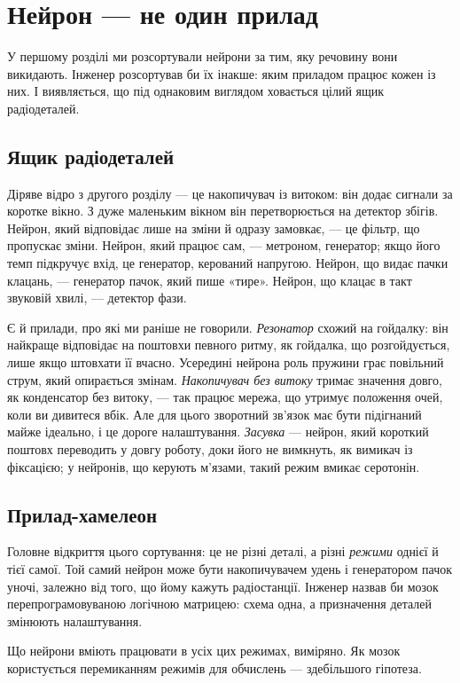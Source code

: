 \chapter{Нейрон --- не один прилад}

У першому розділі ми розсортували нейрони за тим, яку речовину вони викидають. Інженер розсортував би їх інакше: яким приладом працює кожен із них. І виявляється, що під однаковим виглядом ховається цілий ящик радіодеталей.

\section*{Ящик радіодеталей}

Діряве відро з другого розділу --- це накопичувач із витоком: він додає сигнали за коротке вікно. З дуже маленьким вікном він перетворюється на детектор збігів. Нейрон, який відповідає лише на зміни й одразу замовкає, --- це фільтр, що пропускає зміни. Нейрон, який працює сам, --- метроном, генератор; якщо його темп підкручує вхід, це генератор, керований напругою. Нейрон, що видає пачки клацань, --- генератор пачок, який пише «тире». Нейрон, що клацає в такт звуковій хвилі, --- детектор фази.


Є й прилади, про які ми раніше не говорили. \emph{Резонатор} схожий на гойдалку: він найкраще відповідає на поштовхи певного ритму, як гойдалка, що розгойдується, лише якщо штовхати її вчасно. Усередині нейрона роль пружини грає повільний струм, який опирається змінам. \emph{Накопичувач без витоку} тримає значення довго, як конденсатор без витоку, --- так працює мережа, що утримує положення очей, коли ви дивитеся вбік. Але для цього зворотний зв'язок має бути підігнаний майже ідеально, і це дороге налаштування. \emph{Засувка} --- нейрон, який короткий поштовх переводить у довгу роботу, доки його не вимкнуть, як вимикач із фіксацією; у нейронів, що керують м'язами, такий режим вмикає серотонін.

\section*{Прилад-хамелеон}

Головне відкриття цього сортування: це не різні деталі, а різні \emph{режими} однієї й тієї самої. Той самий нейрон може бути накопичувачем удень і генератором пачок уночі, залежно від того, що йому кажуть радіостанції. Інженер назвав би мозок перепрограмовуваною логічною матрицею: схема одна, а призначення деталей змінюють налаштування.

Що нейрони вміють працювати в усіх цих режимах, виміряно. Як мозок користується перемиканням режимів для обчислень --- здебільшого гіпотеза.

